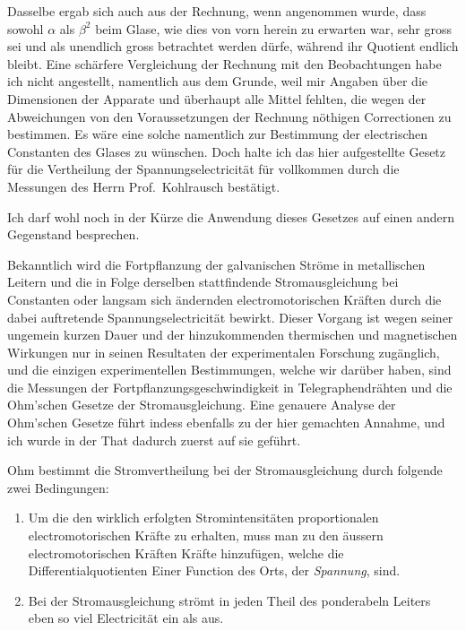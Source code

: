 \documentclass[12pt,a4paper]{book}
\theoremstyle{definition}
\theoremstyle{remark}
\begin{document}
Dasselbe ergab sich auch aus der Rechnung, wenn angenommen wurde, dass sowohl $\alpha$ als $\beta^2$ beim Glase, wie dies von vorn herein zu erwarten war, sehr gross sei und als unendlich gross betrachtet werden dürfe, während ihr Quotient endlich bleibt. Eine schärfere Vergleichung der Rechnung mit den Beobachtungen habe ich nicht angestellt, namentlich aus dem Grunde, weil mir Angaben über die Dimensionen der Apparate und überhaupt alle Mittel fehlten, die wegen der Abweichungen von den Voraussetzungen der Rechnung nöthigen Correctionen zu bestimmen. Es wäre eine solche namentlich zur Bestimmung der electrischen Constanten des Glases zu wünschen. Doch halte ich das hier aufgestellte Gesetz für die Vertheilung der Spannungselectricität für vollkommen durch die Messungen des Herrn Prof.~Kohlrausch bestätigt.

Ich darf wohl noch in der Kürze die Anwendung dieses Gesetzes auf einen andern Gegenstand besprechen.

Bekanntlich wird die Fortpflanzung der galvanischen Ströme in metallischen Leitern und die in Folge derselben stattfindende Stromausgleichung bei Constanten oder langsam sich ändernden electromotorischen Kräften durch die dabei auftretende Spannungselectricität bewirkt. Dieser Vorgang ist wegen seiner ungemein kurzen Dauer und der hinzukommenden thermischen und magnetischen Wirkungen nur in seinen Resultaten der experimentalen Forschung zugänglich, und die einzigen experimentellen Bestimmungen, welche wir darüber haben, sind die Messungen der Fortpflanzungsgeschwindigkeit in Telegraphendrähten und die Ohm'schen Gesetze der Stromausgleichung. Eine genauere Analyse der Ohm'schen Gesetze führt indess ebenfalls zu der hier gemachten Annahme, und ich wurde in der That dadurch zuerst auf sie geführt.

Ohm bestimmt die Stromvertheilung bei der Stromausgleichung durch folgende zwei Bedingungen:
\begin{enumerate}
\item Um die den wirklich erfolgten Stromintensitäten proportionalen electromotorischen Kräfte zu erhalten, muss man zu den äussern electromotorischen Kräften Kräfte hinzufügen, welche die Differentialquotienten Einer Function des Orts, der \textit{Spannung}, sind.
\item Bei der Stromausgleichung strömt in jeden Theil des ponderabeln Leiters eben so viel Electricität ein als aus.
\end{enumerate}
\end{document}
